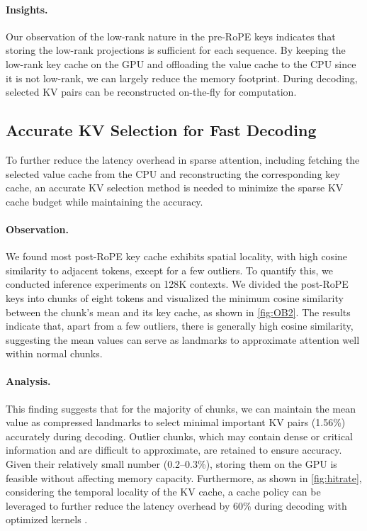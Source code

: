 \paragraph{Insights.} Our observation of the low-rank nature in the pre-RoPE keys indicates that storing the low-rank projections is sufficient for each sequence. By keeping the low-rank key cache on the GPU and offloading the value cache to the CPU since it is not low-rank, we can largely reduce the memory footprint. During decoding, selected KV pairs can be reconstructed on-the-fly for computation.

\subsection{Accurate KV Selection for Fast Decoding}
To further reduce the latency overhead in sparse attention, including fetching the selected value cache from the CPU and reconstructing the corresponding key cache, an accurate KV selection method is needed to minimize the sparse KV cache budget while maintaining the accuracy.

\paragraph{Observation.} We found most post-RoPE key cache exhibits spatial locality, with high cosine similarity to adjacent tokens, except for a few outliers. To quantify this, we conducted inference experiments on 128K contexts. We divided the post-RoPE keys into chunks of eight tokens and visualized the minimum cosine similarity between the chunk's mean and its key cache, as shown in \cref{fig:OB2}. The results indicate that, apart from a few outliers, there is generally high cosine similarity, suggesting the mean values can serve as landmarks to approximate attention well within normal chunks.

\paragraph{Analysis.} This finding suggests that for the majority of chunks, we can maintain the mean value as compressed landmarks to select minimal important KV pairs (1.56\%) accurately during decoding. Outlier chunks, which may contain dense or critical information and are difficult to approximate, are retained to ensure accuracy. Given their relatively small number (0.2--0.3\%), storing them on the GPU is feasible without affecting memory capacity. Furthermore, as shown in \cref{fig:hitrate}, considering the temporal locality of the KV cache, a cache policy \citep{zhang2024pqcache} can be leveraged to further reduce the latency overhead by 60\% during decoding with optimized kernels \citep{nvidia2020cuda}.

